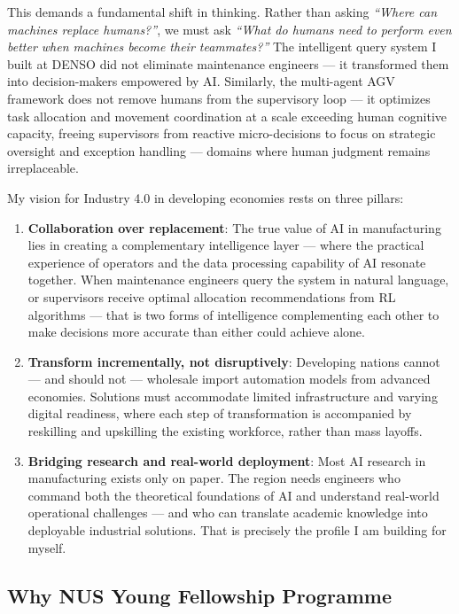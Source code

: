 \documentclass[
  12pt,
]{article}
\begin{document}
This demands a fundamental shift in thinking. Rather than asking
\emph{“Where can machines replace humans?”}, we must ask \emph{“What do
humans need to perform even better when machines become their
teammates?”} The intelligent query system I built at DENSO did not
eliminate maintenance engineers — it transformed them into
decision-makers empowered by AI. Similarly, the multi-agent AGV
framework does not remove humans from the supervisory loop — it
optimizes task allocation and movement coordination at a scale exceeding
human cognitive capacity, freeing supervisors from reactive
micro-decisions to focus on strategic oversight and exception handling —
domains where human judgment remains irreplaceable.

My vision for Industry 4.0 in developing economies rests on three
pillars:

\begin{enumerate}
\def\labelenumi{\arabic{enumi}.}
\item
  \textbf{Collaboration over replacement}: The true value of AI in
  manufacturing lies in creating a complementary intelligence layer —
  where the practical experience of operators and the data processing
  capability of AI resonate together. When maintenance engineers query
  the system in natural language, or supervisors receive optimal
  allocation recommendations from RL algorithms — that is two forms of
  intelligence complementing each other to make decisions more accurate
  than either could achieve alone.
\item
  \textbf{Transform incrementally, not disruptively}: Developing nations
  cannot — and should not — wholesale import automation models from
  advanced economies. Solutions must accommodate limited infrastructure
  and varying digital readiness, where each step of transformation is
  accompanied by reskilling and upskilling the existing workforce,
  rather than mass layoffs.
\item
  \textbf{Bridging research and real-world deployment}: Most AI research
  in manufacturing exists only on paper. The region needs engineers who
  command both the theoretical foundations of AI and understand
  real-world operational challenges — and who can translate academic
  knowledge into deployable industrial solutions. That is precisely the
  profile I am building for myself.
\end{enumerate}

\hypertarget{why-nus-young-fellowship-programme}{%
\subsection{Why NUS Young Fellowship
Programme}\label{why-nus-young-fellowship-programme}}
\end{document}
